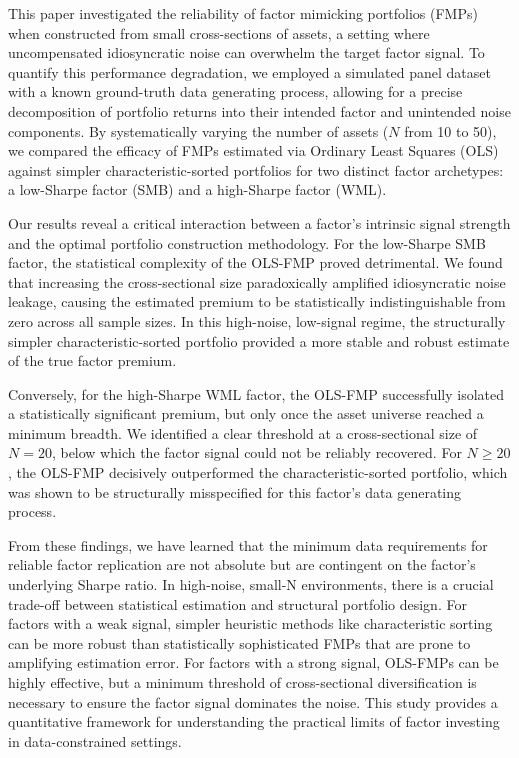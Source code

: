 \documentclass[]{article}
\begin{document}
This paper investigated the reliability of factor mimicking portfolios (FMPs) when constructed from small cross-sections of assets, a setting where uncompensated idiosyncratic noise can overwhelm the target factor signal. To quantify this performance degradation, we employed a simulated panel dataset with a known ground-truth data generating process, allowing for a precise decomposition of portfolio returns into their intended factor and unintended noise components. By systematically varying the number of assets ($N$ from 10 to 50), we compared the efficacy of FMPs estimated via Ordinary Least Squares (OLS) against simpler characteristic-sorted portfolios for two distinct factor archetypes: a low-Sharpe factor (SMB) and a high-Sharpe factor (WML).

Our results reveal a critical interaction between a factor's intrinsic signal strength and the optimal portfolio construction methodology. For the low-Sharpe SMB factor, the statistical complexity of the OLS-FMP proved detrimental. We found that increasing the cross-sectional size paradoxically amplified idiosyncratic noise leakage, causing the estimated premium to be statistically indistinguishable from zero across all sample sizes. In this high-noise, low-signal regime, the structurally simpler characteristic-sorted portfolio provided a more stable and robust estimate of the true factor premium.

Conversely, for the high-Sharpe WML factor, the OLS-FMP successfully isolated a statistically significant premium, but only once the asset universe reached a minimum breadth. We identified a clear threshold at a cross-sectional size of $N=20$, below which the factor signal could not be reliably recovered. For $N \ge 20$, the OLS-FMP decisively outperformed the characteristic-sorted portfolio, which was shown to be structurally misspecified for this factor's data generating process.

From these findings, we have learned that the minimum data requirements for reliable factor replication are not absolute but are contingent on the factor's underlying Sharpe ratio. In high-noise, small-N environments, there is a crucial trade-off between statistical estimation and structural portfolio design. For factors with a weak signal, simpler heuristic methods like characteristic sorting can be more robust than statistically sophisticated FMPs that are prone to amplifying estimation error. For factors with a strong signal, OLS-FMPs can be highly effective, but a minimum threshold of cross-sectional diversification is necessary to ensure the factor signal dominates the noise. This study provides a quantitative framework for understanding the practical limits of factor investing in data-constrained settings.
\end{document}
